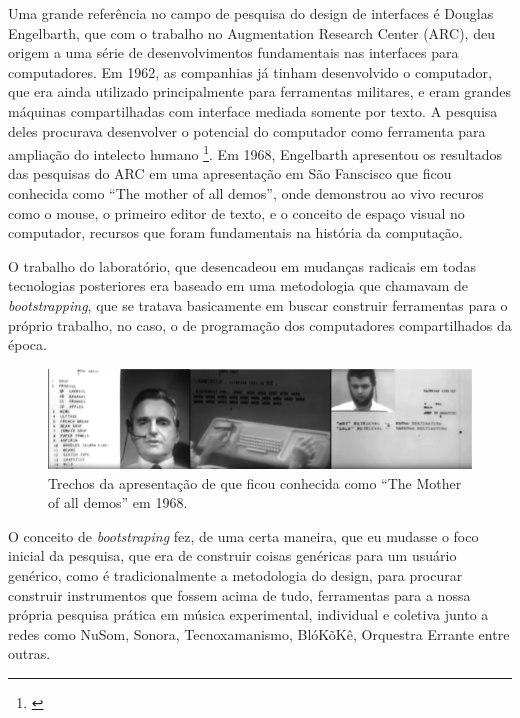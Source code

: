 Uma grande referência no campo de pesquisa do design de interfaces é Douglas Engelbarth, que com o trabalho no Augmentation Research Center (ARC), deu origem a uma série de desenvolvimentos fundamentais nas interfaces para computadores. Em 1962, as companhias já tinham desenvolvido o computador, que era ainda utilizado principalmente para ferramentas militares, e eram grandes máquinas compartilhadas com interface mediada somente por texto. A pesquisa deles procurava desenvolver o potencial do computador como ferramenta para ampliação do intelecto humano \footnote{\cite{Engelbart1962}}. Em 1968, Engelbarth apresentou os resultados das pesquisas do ARC em uma apresentação em São Fanscisco que ficou conhecida como ``The mother of all demos'', onde demonstrou ao vivo recuros como o mouse, o primeiro editor de texto, e o conceito de espaço visual no computador, recursos que foram fundamentais na história da computação. 


O trabalho do laboratório, que desencadeou em mudanças radicais em todas tecnologias posteriores era baseado em uma metodologia que chamavam de \emph{bootstrapping}, que se tratava basicamente em buscar construir ferramentas para o próprio trabalho, no caso, o de programação dos computadores compartilhados da época.  


\begin{figure}
    \caption{\label{motherofalldemos}Trechos da apresentação de que ficou conhecida como ``The Mother of all demos'' em 1968.}
    
        \includegraphics[width=1\linewidth]{pictures/cap2/mother_of_all}
    
\end{figure}



O conceito de \emph{bootstraping} fez, de uma certa maneira, que eu mudasse o foco inicial da pesquisa, que era de construir coisas genéricas para um usuário genérico, como é tradicionalmente a metodologia do design, para procurar construir instrumentos que fossem acima de tudo, ferramentas para a nossa própria pesquisa prática em música experimental, individual e coletiva junto a redes como NuSom, Sonora, Tecnoxamanismo, BlóKõKê, Orquestra Errante entre outras.


